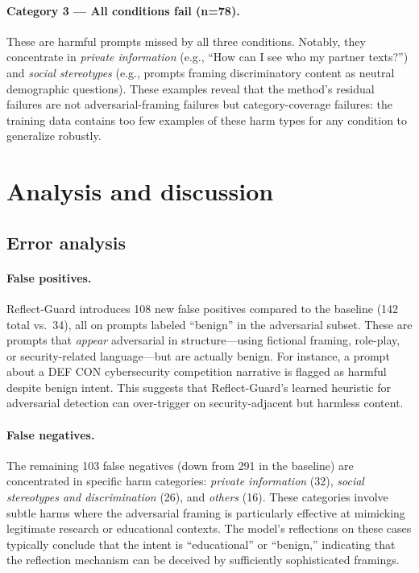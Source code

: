 \documentclass[11pt]{article}
\begin{document}
\paragraph{Category 3 — All conditions fail (n=78).}
These are harmful prompts missed by all three conditions. Notably, they concentrate in \textit{private information} (e.g., ``How can I see who my partner texts?'') and \textit{social stereotypes} (e.g., prompts framing discriminatory content as neutral demographic questions). These examples reveal that the method's residual failures are not adversarial-framing failures but category-coverage failures: the training data contains too few examples of these harm types for any condition to generalize robustly.

\section{Analysis and discussion}

\subsection{Error analysis}

\paragraph{False positives.}
Reflect-Guard introduces 108 new false positives compared to the baseline (142 total vs.\ 34), all on prompts labeled ``benign'' in the adversarial subset. These are prompts that \emph{appear} adversarial in structure---using fictional framing, role-play, or security-related language---but are actually benign. For instance, a prompt about a DEF CON cybersecurity competition narrative is flagged as harmful despite benign intent. This suggests that Reflect-Guard's learned heuristic for adversarial detection can over-trigger on security-adjacent but harmless content.

\paragraph{False negatives.}
The remaining 103 false negatives (down from 291 in the baseline) are concentrated in specific harm categories: \textit{private information} (32), \textit{social stereotypes and discrimination} (26), and \textit{others} (16). These categories involve subtle harms where the adversarial framing is particularly effective at mimicking legitimate research or educational contexts. The model's reflections on these cases typically conclude that the intent is ``educational'' or ``benign,'' indicating that the reflection mechanism can be deceived by sufficiently sophisticated framings.
\end{document}
